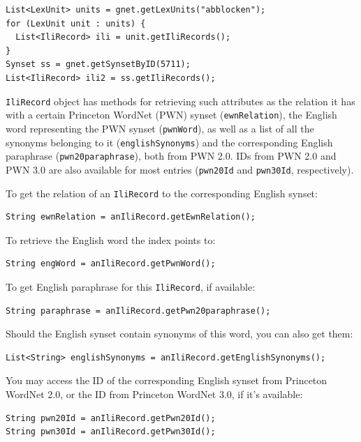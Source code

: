 \documentclass[12pt,a4paper,english,utf8]{report}
\begin{document}
\begin{lstlisting}
List<LexUnit> units = gnet.getLexUnits("abblocken");
for (LexUnit unit : units) {
  List<IliRecord> ili = unit.getIliRecords();
}
Synset ss = gnet.getSynsetByID(5711);
List<IliRecord> ili2 = ss.getIliRecords();
\end{lstlisting}

\texttt{IliRecord} object has methods for retrieving such attributes as the relation it has with a certain Princeton WordNet (PWN) synset (\texttt{ewnRelation}), the English word representing the PWN synset (\texttt{pwnWord}), as well as a list of all the synonyms belonging to it (\texttt{englishSynonyms}) and the corresponding English paraphrase (\texttt{pwn20paraphrase}), both from PWN 2.0. IDs from PWN 2.0 and PWN 3.0 are also available for most entries (\texttt{pwn20Id} and \texttt{pwn30Id}, respectively).

To get the relation of an \texttt{IliRecord} to the corresponding English synset:

\begin{lstlisting}
String ewnRelation = anIliRecord.getEwnRelation();
\end{lstlisting}

To retrieve the English word the index points to:

\begin{lstlisting}
String engWord = anIliRecord.getPwnWord();
\end{lstlisting}

To get English paraphrase for this \texttt{IliRecord}, if available:

\begin{lstlisting}
String paraphrase = anIliRecord.getPwn20paraphrase();
\end{lstlisting}

Should the English synset contain synonyms of this word, you can also get them:

\begin{lstlisting}
List<String> englishSynonyms = anIliRecord.getEnglishSynonyms();
\end{lstlisting}

You may access the ID of the corresponding English synset from Princeton WordNet 2.0, or the ID from Princeton WordNet 3.0, if it's available:

\begin{lstlisting}
String pwn20Id = anIliRecord.getPwn20Id();
String pwn30Id = anIliRecord.getPwn30Id();
\end{lstlisting}
\end{document}
